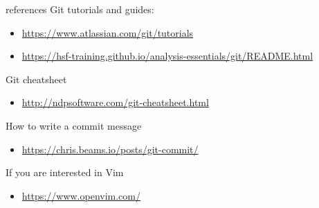 \begin{frame}[fragile]{references}
    Git tutorials and guides:
    \begin{itemize}
        \item \url{https://www.atlassian.com/git/tutorials}
        \item \url{https://hsf-training.github.io/analysis-essentials/git/README.html}
    \end{itemize}
    Git cheatsheet
    \begin{itemize}
        \item \url{http://ndpsoftware.com/git-cheatsheet.html}
    \end{itemize}
    How to write a commit message
    \begin{itemize}
        \item \url{https://chris.beams.io/posts/git-commit/}
    \end{itemize}
    If you are interested in Vim
    \begin{itemize}
        \item \url{https://www.openvim.com/}
    \end{itemize}
    
\end{frame}

